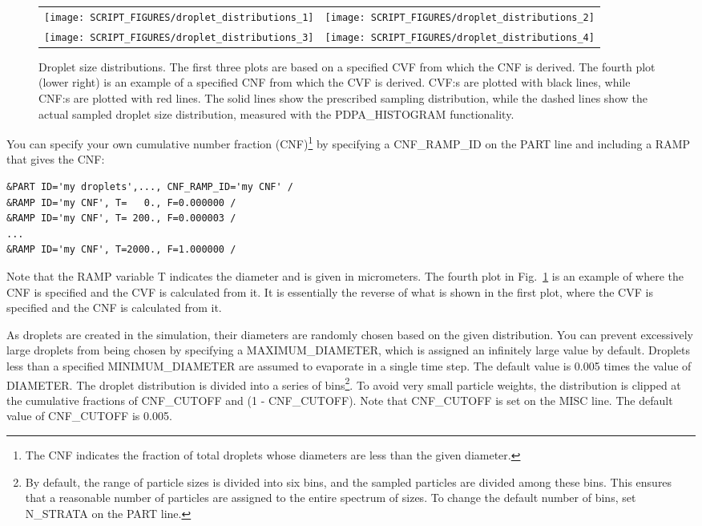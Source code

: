 \documentclass[11pt]{book}
\begin{document}
\begin{figure}[ht]
\begin{tabular}{ll}
\texttt{[image: SCRIPT\_FIGURES/droplet\_distributions\_1]} &
\texttt{[image: SCRIPT\_FIGURES/droplet\_distributions\_2]} \\
\texttt{[image: SCRIPT\_FIGURES/droplet\_distributions\_3]} &
\texttt{[image: SCRIPT\_FIGURES/droplet\_distributions\_4]}
\end{tabular}
\caption[Droplet size distributions]{Droplet size distributions. The first three plots are based on a specified CVF from which the CNF is derived. The fourth plot (lower right) is an example of a specified CNF from which the CVF is derived. CVF:s are plotted with black lines, while CNF:s are plotted with red lines. The solid lines show the prescribed sampling distribution, while the dashed lines show the actual sampled droplet size distribution, measured with the {\ct PDPA\_HISTOGRAM} functionality.}
\label{droplet_distributions}
\end{figure}


You can specify your own cumulative number fraction (CNF)\footnote{The CNF indicates the fraction of total droplets whose diameters are less than the given diameter.} by specifying a {\ct CNF\_RAMP\_ID} on the {\ct PART} line and including a {\ct RAMP} that gives the CNF:
\begin{lstlisting}
&PART ID='my droplets',..., CNF_RAMP_ID='my CNF' /
&RAMP ID='my CNF', T=   0., F=0.000000 /
&RAMP ID='my CNF', T= 200., F=0.000003 /
...
&RAMP ID='my CNF', T=2000., F=1.000000 /
\end{lstlisting}
Note that the {\ct RAMP} variable {\ct T} indicates the diameter and is given in micrometers. The fourth plot in Fig.~\ref{droplet_distributions} is an example of where the CNF is specified and the CVF is calculated from it. It is essentially the reverse of what is shown in the first plot, where the CVF is specified and the CNF is calculated from it.

As droplets are created in the simulation, their diameters are randomly chosen based on the given distribution. You can prevent excessively large droplets from being chosen by specifying a {\ct MAXIMUM\_DIAMETER}, which is assigned an infinitely large value by default. Droplets less than a specified {\ct MINIMUM\_DIAMETER} are assumed to evaporate in a single time step. The default value is 0.005 times the value of {\ct DIAMETER}. The droplet distribution is divided into a series of bins\footnote{By default, the range of particle sizes is divided into six bins, and the sampled particles are divided among these bins. This ensures that a reasonable number of particles are assigned to the entire spectrum of sizes. To change the default number of bins, set {\ct N\_STRATA} on the {\ct PART} line.}. To avoid very small particle weights, the distribution is clipped at the cumulative fractions of {\ct CNF\_CUTOFF} and (1 - {\ct CNF\_CUTOFF}).  Note that {\ct CNF\_CUTOFF} is set on the {\ct MISC} line. The default value of {\ct CNF\_CUTOFF} is 0.005.
\end{document}
